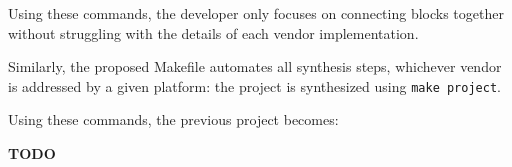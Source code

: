 \documentclass[12pt,oneside]{article}
\begin{document}
Using these commands, the developer only focuses on connecting blocks together without
struggling with the details of each vendor implementation.

Similarly, the proposed Makefile automates all synthesis steps, whichever vendor is addressed
by a given platform: the project is synthesized using {\tt make project}.

Using these commands, the previous project becomes:

{\bf TODO}
\end{document}
